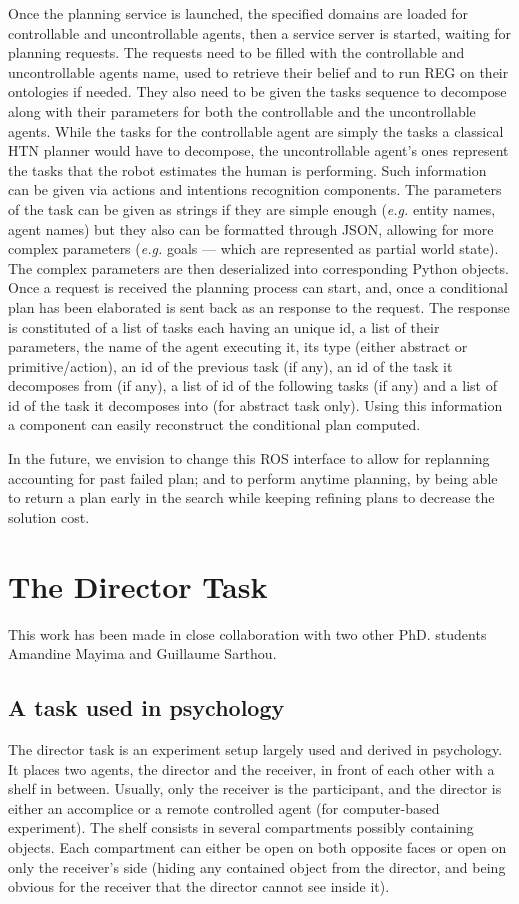 \documentclass[a4paper,11pt,twoside]{StyleThese}
\begin{document}
Once the planning service is launched, the specified domains are loaded for controllable and uncontrollable agents, then a service server is started, waiting for planning requests. 
The requests need to be filled with the controllable and uncontrollable agents name, used to retrieve their belief and to run REG on their ontologies if needed. 
They also need to be given the tasks sequence to decompose along with their parameters for both the controllable and the uncontrollable agents. While the tasks for the controllable agent are simply the tasks a classical HTN planner would have to decompose, the uncontrollable agent's ones represent the tasks that the robot estimates the human is performing. Such information can be given via actions and intentions recognition components. The parameters of the task can be given as strings if they are simple enough (\textit{e.g.} entity names, agent names) but they also can be formatted through JSON, allowing for more complex parameters (\textit{e.g.} goals --- which are represented as partial world state). The complex parameters are then deserialized into corresponding Python objects.
Once a request is received the planning process can start, and, once a conditional plan has been elaborated is sent back as an response to the request. The response is constituted of a list of tasks each having an unique id, a list of their parameters, the name of the agent executing it, its type (either abstract or primitive/action), an id of the previous task (if any), an id of the task it decomposes from (if any), a list of id of the following tasks (if any) and a list of id of the task it decomposes into (for abstract task only). Using this information a component can easily reconstruct the conditional plan computed.

In the future, we envision to change this ROS interface to allow for replanning accounting for past failed plan; and to perform anytime planning, by being able to return a plan early in the search while keeping refining plans to decrease the solution cost.

\section{The Director Task}
This work has been made in close collaboration with two other PhD. students Amandine Mayima and Guillaume Sarthou.

\subsection{A task used in psychology}
The director task is an experiment setup largely used and derived in psychology. It places two agents, the director and the receiver, in front of each other with a shelf in between. Usually, only the receiver is the participant, and the director is either an accomplice or a remote controlled agent (for computer-based experiment). The shelf consists in several compartments possibly containing objects. Each compartment can either be open on both opposite faces or open on only the receiver's side (hiding any contained object from the director, and being obvious for the receiver that the director cannot see inside it).
\end{document}
